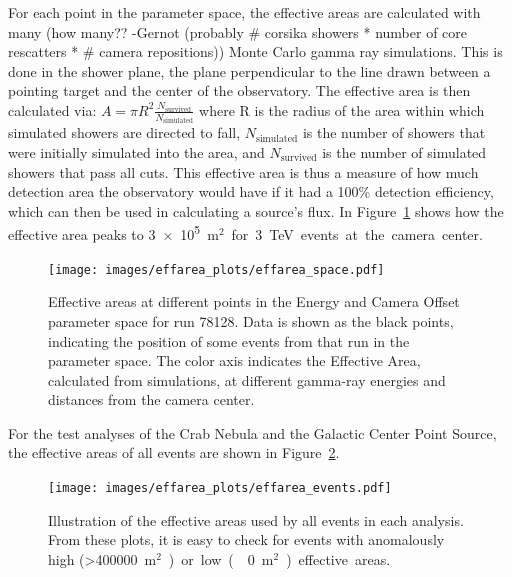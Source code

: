     For each point in the parameter space, the effective areas are calculated with many {\color{red}(how many?? -Gernot (probably # corsika showers * number of core rescatters * # camera repositions))} Monte Carlo gamma ray simulations.
    This is done in the shower plane, the plane perpendicular to the line drawn between a pointing target and the center of the observatory.
    The effective area is then calculated via:
    $A=\pi R^2 \frac{N_{\text{survived}}}{N_{\text{simulated}}}$
    where R is the radius of the area within which simulated showers are directed to fall, $N_{\text{simulated}}$ is the number of showers that were initially simulated into the area, and $N_{\text{survived}}$ is the number of simulated showers that pass all cuts.
    This effective area is thus a measure of how much detection area the observatory would have if it had a 100\% detection efficiency, which can then be used in calculating a source's flux.
    In Figure~\ref{fig:effarea_paramspace} shows how the effective area peaks to \nicetilde{}\SI{3e5}{m${}^2$} for \SI{3}{\TeV} events at the camera center.

    \begin{figure}[ht]
      \centering
      \texttt{[image: images/effarea\_plots/effarea\_space.pdf]}
      \caption[Effective Area Parameter Space]{
        Effective areas at different points in the Energy and Camera Offset parameter space for run 78128.
        Data is shown as the black points, indicating the position of some events from that run in the parameter space.
        The color axis indicates the Effective Area, calculated from simulations, at different gamma-ray energies and distances from the camera center.
      }
      \label{fig:effarea_paramspace}
    \end{figure}

    For the test analyses of the Crab Nebula and the Galactic Center Point Source, the effective areas of all events are shown in Figure~\ref{fig:effarea_usage}.

    \begin{figure}[ht]
      \centering
      \texttt{[image: images/effarea\_plots/effarea\_events.pdf]}
      \caption[Effective Areas Used]{
      Illustration of the effective areas used by all events in each analysis.
      From these plots, it is easy to check for events with anomalously high (>\SI{400000}{m${}^2$}) or low (\nicetilde\SI{0}{m${}^2$}) effective areas.
      }
      \label{fig:effarea_usage}
    \end{figure}
  
